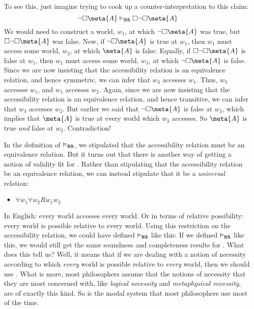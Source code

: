 To see this, just imagine trying to cook up a counter-interpretation to this claim:
\[
	\enot\ebox\meta{A} \entails_\mlSfive  \ebox \enot\ebox \meta{A}
\]
We would need to construct a world, $w_1$, at which $\enot\ebox\meta{A}$ was true, but $\ebox \enot\ebox \meta{A}$ was false. 
Now, if $\enot\ebox\meta{A}$ is true at $w_1$, then $w_1$ must access some world, $w_2$, at which $\meta{A}$ is false. Equally, if $\ebox \enot\ebox \meta{A}$ is false at $w_1$, then $w_1$ must access some world, $w_3$, at which $\enot\ebox \meta{A}$ is false. Since we are now insisting that the accessibility relation is an equivalence relation, and hence symmetric, we can infer that $w_3$ accesses $w_1$. Thus, $w_3$ accesses $w_1$, and $w_1$ accesses $w_2$. Again, since we are now insisting that the accessibility relation is an equivalence relation, and hence transitive, we can infer that $w_3$ accesses $w_2$. But earlier we said that $\enot\ebox \meta{A}$ is false at $w_3$, which implies that $\meta{A}$ is true at every world which $w_3$ accesses. So $\meta{A}$ is true \emph{and} false at $w_2$. Contradiction!

In the definition of $\vDash_{\mathbf{S5}} $, we stipulated that the accessibility relation must be an equivalence relation. But it turns out that there is another way of getting a notion of validity fit for \mlSfive. Rather than stipulating that the accessibility relation be an equivalence relation, we can instead stipulate that it be a \emph{universal} relation:
\begin{itemize}
	\item $\forall w_1\forall w_2Rw_1w_2$
\end{itemize}
In English: every world accesses every world. Or in terms of relative possibility: every world is possible relative to every world. Using this restriction on the accessibility relation, we could have defined $\vDash_{\mathbf{S5}} $ like this:
If we defined $\vDash_{\mathbf{S5}} $ like this, we would still get the same soundness and completeness results for \mlSfive. What does this tell us? Well, it means that if we are dealing with a notion of necessity according to which \emph{every} world is possible relative to \emph{every} world, then we should use \mlSfive. What is more, most philosophers assume that the notions of necessity that they are most concerned with, like \emph{logical necessity} and \emph{metaphysical necessity}, are of exactly this kind. So \mlSfive{} is the modal system that most philosophers use most of the time.

